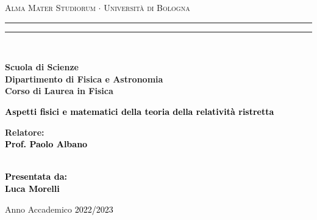 \begin{titlepage}

\begin{center}
	{{\Large{\textsc{Alma Mater Studiorum $\cdot$ Universit\`a di Bologna}}}} 
	\rule[0.1cm]{15.8cm}{0.1mm}
	\rule[0.5cm]{15.8cm}{0.6mm}
	\\\vspace{3mm}
	
	{\small{\bf Scuola di Scienze \\ 
			Dipartimento di Fisica e Astronomia\\
			Corso di Laurea in Fisica}}
	
\end{center}

\vspace{23mm}

\begin{center}\textcolor{black}{
		{\LARGE{\bf Aspetti fisici e matematici della teoria della relatività ristretta}}\\
}\end{center}

\vspace{50mm} \par \noindent

\begin{minipage}[t]{0.47\textwidth}
	\large{\bf Relatore: \vspace{2mm}\\\textcolor{black}{
				Prof. Paolo Albano}}\\\\
\end{minipage}
%
\hfill
%
\begin{minipage}[t]{0.47\textwidth}\raggedleft \textcolor{black}{
		{\large{\bf Presentata da:
				\vspace{2mm}\\
				Luca Morelli}}}
\end{minipage}

\vspace{40mm}

\begin{center}
	Anno Accademico \textcolor{black}{ 2022/2023}
\end{center}


\end{titlepage}